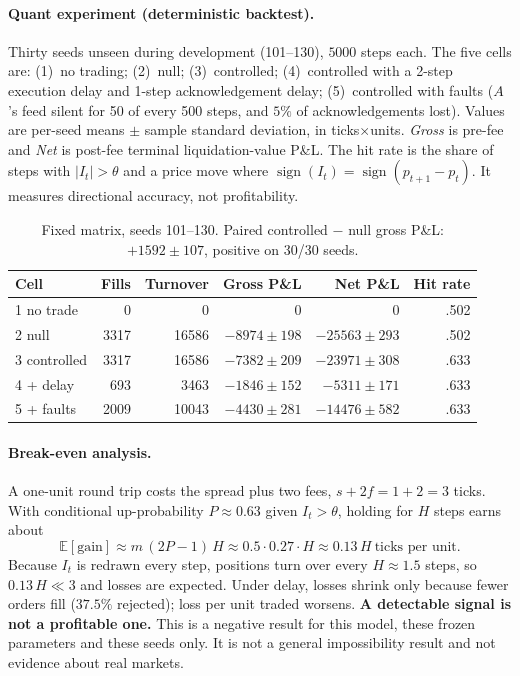 \documentclass[11pt]{article}
\theoremstyle{remark}
\begin{document}
\paragraph{Quant experiment (deterministic backtest).}
Thirty seeds unseen during development (101--130), $5000$ steps each. The five cells are:
(1)~no trading; (2)~null; (3)~controlled; (4)~controlled with a 2-step execution delay and
1-step acknowledgement delay; (5)~controlled with faults ($A$'s feed silent for 50 of every 500
steps, and $5\%$ of acknowledgements lost). Values are per-seed means $\pm$ sample standard
deviation, in ticks$\times$units. \emph{Gross} is pre-fee and \emph{Net} is post-fee terminal
liquidation-value P\&L. The hit rate is the share of steps with $|I_t| > \theta$ and a price
move where $\operatorname{sign}(I_t) = \operatorname{sign}(p_{t+1} - p_t)$. It measures
directional accuracy, not profitability.

\begin{table}[h]
\centering
\begin{tabular}{@{}lrrrrr@{}}
\toprule
Cell & Fills & Turnover & Gross P\&L & Net P\&L & Hit rate \\
\midrule
1 no trade      & 0    & 0     & 0               & 0                & .502 \\
2 null          & 3317 & 16586 & $-8974 \pm 198$ & $-25563 \pm 293$ & .502 \\
3 controlled    & 3317 & 16586 & $-7382 \pm 209$ & $-23971 \pm 308$ & .633 \\
4 + delay       & 693  & 3463  & $-1846 \pm 152$ & $-5311 \pm 171$  & .633 \\
5 + faults      & 2009 & 10043 & $-4430 \pm 281$ & $-14476 \pm 582$ & .633 \\
\bottomrule
\end{tabular}
\caption{Fixed matrix, seeds 101--130. Paired controlled $-$ null gross P\&L:
$+1592 \pm 107$, positive on 30/30 seeds.}
\end{table}

\paragraph{Break-even analysis.}
A one-unit round trip costs the spread plus two fees, $s + 2f = 1 + 2 = 3$ ticks. With
conditional up-probability $P \approx 0.63$ given $I_t > \theta$, holding for $H$ steps earns
about
\begin{equation}
  \mathbb{E}[\text{gain}] \approx m\,(2P - 1)\,H \approx 0.5 \cdot 0.27 \cdot H \approx 0.13\,H
  \ \text{ticks per unit}.
\end{equation}
Because $I_t$ is redrawn every step, positions turn over every $H \approx 1.5$ steps, so
$0.13\,H \ll 3$ and losses are expected. Under delay, losses shrink only because fewer orders
fill ($37.5\%$ rejected); loss per unit traded worsens. \textbf{A detectable signal is not a
profitable one.} This is a negative result for this model, these frozen parameters and these
seeds only. It is not a general impossibility result and not evidence about real markets.
\end{document}

